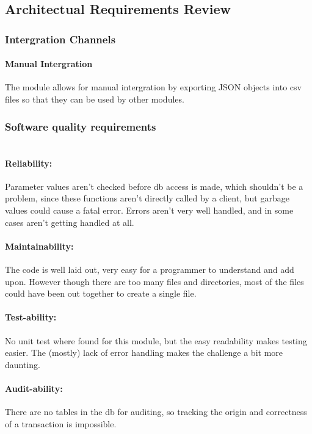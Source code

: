 \subsection{Architectual Requirements Review}

\subsubsection{Intergration Channels}
\paragraph {Manual Intergration}
The module allows for manual intergration by exporting JSON objects into csv files so that they can be used by other modules.
\par

\subsubsection{Software quality requirements} 

\paragraph{\\Reliability:}
Parameter values aren't checked before db access is made, which shouldn't be a problem, since these functions aren't directly called by a client, but garbage values could cause a fatal error. Errors aren't very well handled, and in some cases aren't getting handled at all.
\par
\paragraph{Maintainability:}
The code is well laid out, very easy for a programmer to understand and add upon. However though there are too many files and directories, most of the files could have been out together to create a single file.
\par
\paragraph{Test-ability:}
 No unit test where found for this module, but the easy readability makes testing easier. The (mostly) lack of error handling makes the challenge a bit more daunting.
\par
\paragraph {Audit-ability:}
There are no tables in the db for auditing, so tracking the origin and correctness of a transaction is impossible.
\\
\par
